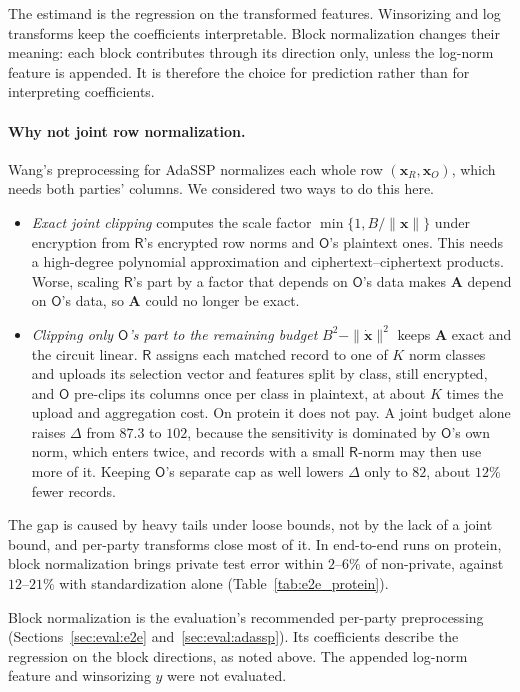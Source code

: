 \documentclass[11pt]{article}
\theoremstyle{definition}
\theoremstyle{plain}
\newcommand{\bx}{\mathbf{x}}
\newcommand{\bxd}{\dot{\mathbf{x}}}
\newcommand{\bA}{\mathbf{A}}
\newcommand{\Party}[1]{\textsf{#1}}
\newcommand{\Rp}{\Party{R}}
\newcommand{\Op}{\Party{O}}
\begin{document}
The estimand is the regression on the transformed features. Winsorizing and log transforms keep the coefficients interpretable. Block normalization changes their meaning: each block contributes through its direction only, unless the log-norm feature is appended. It is therefore the choice for prediction rather than for interpreting coefficients.

\paragraph{Why not joint row normalization.} Wang's preprocessing for AdaSSP normalizes each whole row $(\bx_R, \bx_O)$, which needs both parties' columns. We considered two ways to do this here.
\begin{itemize}[noitemsep]
  \item \emph{Exact joint clipping} computes the scale factor $\min\{1, B/\|\bx\|\}$ under encryption from $\Rp$'s encrypted row norms and $\Op$'s plaintext ones. This needs a high-degree polynomial approximation and ciphertext--ciphertext products. Worse, scaling $\Rp$'s part by a factor that depends on $\Op$'s data makes $\bA$ depend on $\Op$'s data, so $\bA$ could no longer be exact.
  \item \emph{Clipping only $\Op$'s part to the remaining budget} $B^2 - \|\bxd\|^2$ keeps $\bA$ exact and the circuit linear. $\Rp$ assigns each matched record to one of $K$ norm classes and uploads its selection vector and features split by class, still encrypted, and $\Op$ pre-clips its columns once per class in plaintext, at about $K$ times the upload and aggregation cost. On protein it does not pay. A joint budget alone raises $\Delta$ from $87.3$ to $102$, because the sensitivity is dominated by $\Op$'s own norm, which enters twice, and records with a small $\Rp$-norm may then use more of it. Keeping $\Op$'s separate cap as well lowers $\Delta$ only to $82$, about $12\%$ fewer records.
\end{itemize}
The gap is caused by heavy tails under loose bounds, not by the lack of a joint bound, and per-party transforms close most of it. In end-to-end runs on protein, block normalization brings private test error within $2$--$6\%$ of non-private, against $12$--$21\%$ with standardization alone (Table~\ref{tab:e2e_protein}).

Block normalization is the evaluation's recommended per-party preprocessing (Sections~\ref{sec:eval:e2e} and~\ref{sec:eval:adassp}). Its coefficients describe the regression on the block directions, as noted above. The appended log-norm feature and winsorizing $y$ were not evaluated.
\end{document}
